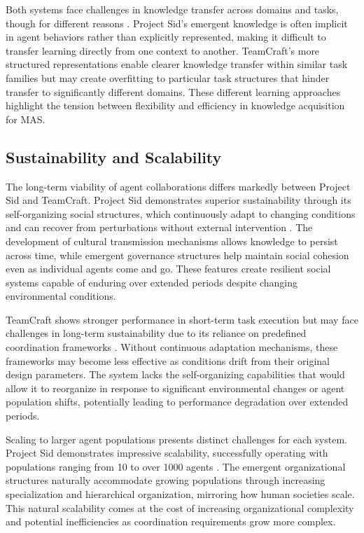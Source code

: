 \documentclass[a4paper, 12pt]{article}
\begin{document}
Both systems face challenges in knowledge transfer across domains and tasks, though for different reasons \autocite{al2024projectsidmanyagentsimulations,long2024teamcraftbenchmarkmultimodalmultiagent,zhao2024steveseriesstepbystepconstruction}. Project Sid's emergent knowledge is often implicit in agent behaviors rather than explicitly represented, making it difficult to transfer learning directly from one context to another. TeamCraft's more structured representations enable clearer knowledge transfer within similar task families but may create overfitting to particular task structures that hinder transfer to significantly different domains. These different learning approaches highlight the tension between flexibility and efficiency in knowledge acquisition for MAS.

\subsection{Sustainability and Scalability}

The long-term viability of agent collaborations differs markedly between Project Sid and TeamCraft. Project Sid demonstrates superior sustainability through its self-organizing social structures, which continuously adapt to changing conditions and can recover from perturbations without external intervention \autocite{al2024projectsidmanyagentsimulations,yu2024minelandsimulatinglargescalemultiagent}. The development of cultural transmission mechanisms allows knowledge to persist across time, while emergent governance structures help maintain social cohesion even as individual agents come and go. These features create resilient social systems capable of enduring over extended periods despite changing environmental conditions.

TeamCraft shows stronger performance in short-term task execution but may face challenges in long-term sustainability due to its reliance on predefined coordination frameworks \autocite{long2024teamcraftbenchmarkmultimodalmultiagent}. Without continuous adaptation mechanisms, these frameworks may become less effective as conditions drift from their original design parameters. The system lacks the self-organizing capabilities that would allow it to reorganize in response to significant environmental changes or agent population shifts, potentially leading to performance degradation over extended periods.

Scaling to larger agent populations presents distinct challenges for each system. Project Sid demonstrates impressive scalability, successfully operating with populations ranging from 10 to over 1000 agents \autocite{al2024projectsidmanyagentsimulations}. The emergent organizational structures naturally accommodate growing populations through increasing specialization and hierarchical organization, mirroring how human societies scale. This natural scalability comes at the cost of increasing organizational complexity and potential inefficiencies as coordination requirements grow more complex.
\end{document}
